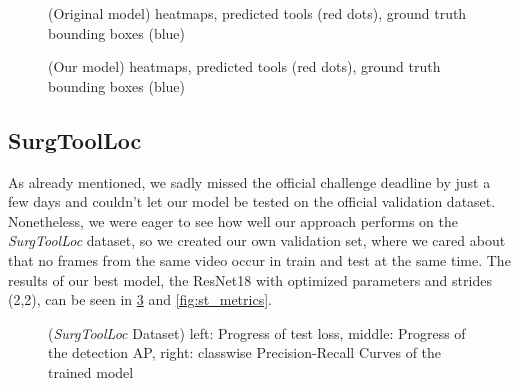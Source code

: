 \begin{figure}[h]
	\centering
	\caption{(Original model) heatmaps, predicted tools (red dots), ground truth bounding boxes (blue)}
	\label{fig:tools_alt}
\end{figure}


\begin{figure}[h]
	\centering
	\caption{(Our model) heatmaps, predicted tools (red dots), ground truth bounding boxes (blue)}
	\label{fig:tools_new}
\end{figure}


\FloatBarrier
\subsection{SurgToolLoc}

As already mentioned, we sadly missed the official challenge deadline by just a few days and couldn't let our model be tested on the official validation dataset. Nonetheless, we were eager to see how well our approach performs on the \emph{SurgToolLoc} dataset, so we created our own validation set, where we cared about that no frames from the same video occur in train and test at the same time. The results of our best model, the ResNet18 with optimized parameters and strides (2,2), can be seen in \ref{fig:st_ap} and \ref{fig:st_metrics}.
\begin{figure}[h]
	\centering
	\caption{(\emph{SurgToolLoc} Dataset) left: Progress of test loss, middle: Progress of the detection AP, right: classwise Precision-Recall Curves of the trained model}
	\label{fig:st_ap}
\end{figure}


